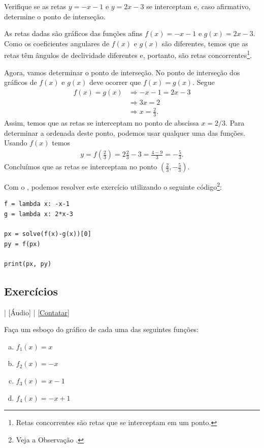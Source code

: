 \begin{exeresol}
  Verifique se as retas $y = -x - 1$ e $y = 2x - 3$ se interceptam e, caso afirmativo, determine o ponto de interseção.
\end{exeresol}
\begin{resol}
  As retas dadas são gráficos das funções afins $f(x) = -x - 1$ e $g(x) = 2x - 3$. Como os coeficientes angulares de $f(x)$ e $g(x)$ são diferentes, temos que as retas têm ângulos de declividade diferentes e, portanto, são retas concorrentes\footnote{Retas concorrentes são retas que se interceptam em um ponto.}.

  Agora, vamos determinar o ponto de interseção. No ponto de interseção dos gráficos de $f(x)$ e $g(x)$ deve ocorrer que $f(x) = g(x)$. Segue
  \begin{align}
    f(x)=g(x) &\Rightarrow -x-1 = 2x-3\\
              &\Rightarrow 3x = 2\\
              &\Rightarrow x = \frac{2}{3}.
  \end{align}
  Assim, temos que as retas se interceptam no ponto de abscissa $x = 2/3$. Para determinar a ordenada deste ponto, podemos usar qualquer uma das funções. Usando $f(x)$ temos
  \begin{align}
    y = f\left(\frac{2}{3}\right) = 2\frac{2}{3} - 3 = \frac{4 - 9}{3} = -\frac{5}{3}.
  \end{align}
  Concluímos que as retas se interceptam no ponto $(\frac{2}{3}, -\frac{5}{3})$.

    \ifispython
    Com o \sympy, podemos resolver este exercício utilizando o seguinte código\footnote{Veja a Observação \label{obs:cap_funafom_python}.}:
\begin{verbatim}
f = lambda x: -x-1
g = lambda x: 2*x-3

px = solve(f(x)-g(x))[0]
py = f(px)

print(px, py)
\end{verbatim}
  \fi
\end{resol}

\subsection*{Exercícios}

\begin{flushright}
  [Vídeo] | [Áudio] | \href{https://phkonzen.github.io/notas/contato.html}{[Contatar]}
\end{flushright}

\begin{ex}
  Faça um esboço do gráfico de cada uma das seguintes funções:
  \begin{enumerate}[a)]
  \item $f_1(x) = x$
  \item $f_2(x) = -x$
  \item $f_3(x) = x-1$
  \item $f_4(x) = -x+1$
  \end{enumerate}
\end{ex}

